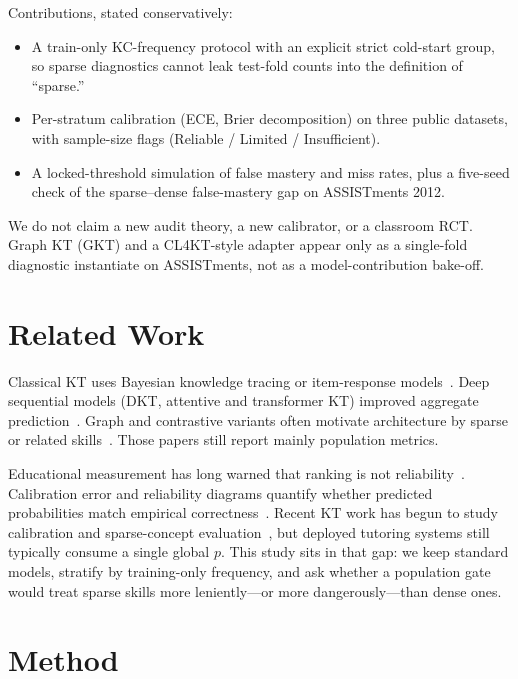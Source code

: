\documentclass[journal,10pt,twocolumn]{IEEEtran}
\begin{document}
Contributions, stated conservatively:

\begin{itemize}
\item A train-only KC-frequency protocol with an explicit strict cold-start group, so sparse diagnostics cannot leak test-fold counts into the definition of ``sparse.''
\item Per-stratum calibration (ECE, Brier decomposition) on three public datasets, with sample-size flags (Reliable / Limited / Insufficient).
\item A locked-threshold simulation of false mastery and miss rates, plus a five-seed check of the sparse--dense false-mastery gap on ASSISTments 2012.
\end{itemize}

We do not claim a new audit theory, a new calibrator, or a classroom RCT. Graph KT (GKT) and a CL4KT-style adapter appear only as a single-fold diagnostic instantiate on ASSISTments, not as a model-contribution bake-off.

\section{Related Work}

Classical KT uses Bayesian knowledge tracing or item-response models~\cite{corbett1994knowledge,rasch1960probabilistic}. Deep sequential models (DKT, attentive and transformer KT) improved aggregate prediction~\cite{piech2015deep,ghosh2020context,liu2023simplekt}. Graph and contrastive variants often motivate architecture by sparse or related skills~\cite{nakagawa2019graph,lee2022cl4kt}. Those papers still report mainly population metrics.

Educational measurement has long warned that ranking is not reliability~\cite{pelanek2015metrics}. Calibration error and reliability diagrams quantify whether predicted probabilities match empirical correctness~\cite{guo2017calibration,naeini2015obtaining,brier1950verification,degroot1983comparison}. Recent KT work has begun to study calibration and sparse-concept evaluation~\cite{yan2026recovering,huang2023sparsekt,bhattacharjee2025coldstart}, but deployed tutoring systems still typically consume a single global $p$. This study sits in that gap: we keep standard models, stratify by training-only frequency, and ask whether a population gate would treat sparse skills more leniently---or more dangerously---than dense ones.

\section{Method}
\end{document}
